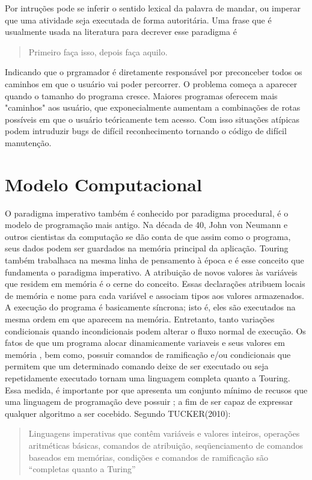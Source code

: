 \documentclass[11pt]{article}
\begin{document}
Por intruções pode se inferir o sentido lexical da palavra de mandar, ou imperar que uma atividade seja executada de forma autoritária. Uma frase que é usualmente  usada na literatura para decrever esse paradigma é

\begin{quote}
Primeiro faça isso, depois faça aquilo.
\end{quote}

Indicando que o prgramador é diretamente responsável por preconceber todos os caminhos em que o usuário vai poder percorrer. O problema começa a aparecer quando o tamanho do programa cresce. Maiores programas oferecem mais "caminhos" aos usuário, que exponecialmente aumentam a combinações de rotas possíveis em que o usuário teóricamente tem acesso. Com isso situações atípicas podem intruduzir bugs de difícil reconhecimento tornando o código de difícil manutenção.

\section{Modelo Computacional}
\label{sec:orgd52ced9}

O paradigma imperativo também é conhecido por paradigma procedural, é o modelo de programação mais antigo. Na década de 40, John von Neumann e outros cientistas da computação se dão conta de que assim como o programa, seus dados podem ser guardados na memória principal da aplicação. Touring também trabalhaca na mesma linha de pensamento à época e é esse conceito que fundamenta o paradigma imperativo. A atribuição de novos valores às variáveis que residem em memória é o cerne do conceito.
Essas declarações atribuem locais de memória e nome para cada variável e associam tipos aos valores armazenados. A execução do programa é basicamente síncrona; isto é, eles são executados na mesma ordem em que aparecem na memória. Entretanto, tanto variações condicionais quando incondicionais podem alterar o fluxo normal de execução. Os fatos de que um programa alocar dinamicamente variaveis e seus valores em memória , bem como, possuir comandos de ramificação e/ou condicionais que permitem que um determinado comando deixe de ser executado ou seja repetidamente executado tornam uma linguagem completa quanto a Touring.
Essa medida, é importante por que apresenta um conjunto mínimo de recusos que uma linguagem de programação deve possuir ; a fim de ser capaz de expressar qualquer algoritmo a ser cocebido. Segundo TUCKER(2010):
\begin{quote}
Linguagens imperativas que contêm variáveis e valores inteiros, operações aritméticas básicas, comandos de atribuição, seqüenciamento de comandos baseados em memórias, condições e comandos de ramificação são “completas quanto a Turing”
\end{quote}
\end{document}
